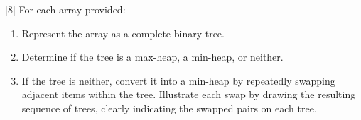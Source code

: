 [8]
For each array provided:
\begin{enumerate}
\item Represent the array as a complete binary tree.
\item Determine if the tree is a max-heap, a min-heap, or neither.
\item If the tree is neither, convert it into a min-heap by repeatedly swapping adjacent items within the tree. Illustrate each swap by drawing the resulting sequence of trees, clearly indicating the swapped pairs on each tree.
\end{enumerate}

